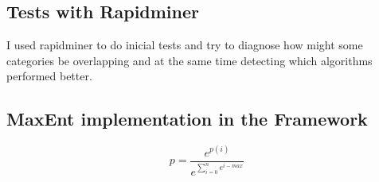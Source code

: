   


\subsection{Tests with Rapidminer}
I used rapidminer\cite{rapidminer} to do inicial tests and try to diagnose how might some categories be overlapping and at the same time detecting which algorithms performed better.


\subsection{MaxEnt implementation in the Framework}

\[
p = \frac{e^{p(i)}}{e^{\sum_{i=0}^{n} e^{i-max}}}
\]

